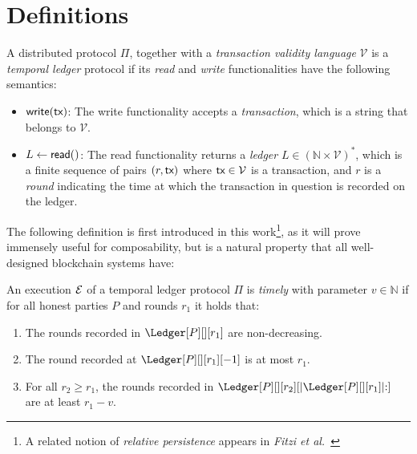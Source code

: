 \section{Definitions}

\begin{definition}
  A distributed protocol $\Pi$, together with a \emph{transaction validity language} $\mathcal{V}$
  is a \emph{temporal ledger} protocol if its \emph{read} and \emph{write}
  functionalities have the following semantics:

  \begin{itemize}
    \item $\textsf{write}(\textsf{tx})$: The write functionality accepts a \emph{transaction}, which is
          a string that belongs to $\mathcal{V}$.
    \item $L \gets \textsf{read}()$: The read functionality returns a \emph{ledger} $L \in (\mathbb{N} \times \mathcal{V})^*$, which is
          a finite sequence of pairs $(r, \textsf{tx})$ where $\textsf{tx} \in \mathcal{V}$ is a transaction, and
          $r$ is a \emph{round} indicating the time at which the transaction in question
          is recorded on the ledger.
  \end{itemize}
\end{definition}

The following definition is first introduced in this work\footnote{A related notion of \emph{relative persistence}
appears in \emph{Fitzi et al.}~\cite{fitzi2020ledger}},
as it will prove
immensely useful for composability, but is a natural property that all well-designed
blockchain systems have:

\begin{definition}[Timely]\label{def:timely}
  An execution $\mathcal{E}$ of a temporal ledger protocol $\Pi$ is \emph{timely} with parameter $v \in \mathbb{N}$
  if for all honest parties $P$ and rounds $r_1$ it holds that:

  \begin{enumerate}
    \item The rounds recorded in $\Ledger[P][][r_1]$ are non-decreasing.\label{def:timely-increasing}
    \item The round recorded at $\Ledger[P][][r_1][-1]$ is at most $r_1$.\label{def:timely-past}
    \item For all $r_2 \geq r_1$, the rounds recorded in $\Ledger[P][][r_2][|\Ledger[P][][r_1]|{:}]$ are at least $r_1 - v$.\label{def:timely-chunk}
  \end{enumerate}
\end{definition}


